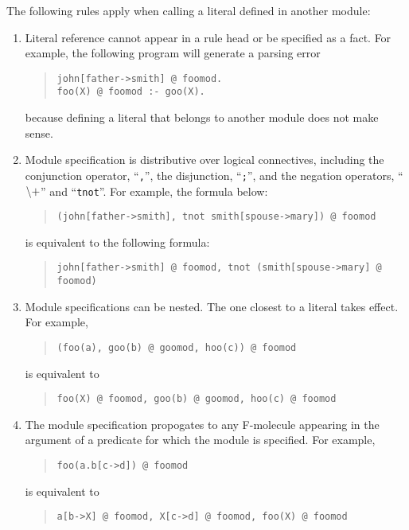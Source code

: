 \documentclass[11pt]{article}
\newcommand{\NAF}{{$\tt\backslash +$}\xspace}
\begin{document}
The following rules apply when calling a literal defined in another module:
\begin{enumerate}
\item Literal reference cannot appear in a rule head or be specified as
  a fact. For example, the following program will generate
  a parsing error
  \begin{quote}
    \verb|john[father->smith] @ foomod.| \\
    \verb|foo(X) @ foomod :- goo(X).|
  \end{quote}
  because defining a literal that belongs to another module does not make
  sense.
  
\item Module specification is distributive over logical connectives,
  including the conjunction operator, ``\verb|,|'', the disjunction,
  ``\verb|;|'', and the negation operators, ``\NAF'' and
  ``\verb|tnot|''. For example, the formula below:
  \begin{quote}
    \verb|(john[father->smith], tnot smith[spouse->mary]) @ foomod|
  \end{quote}
  is equivalent to the following formula:
  \begin{quote}
    \verb|john[father->smith] @ foomod, tnot (smith[spouse->mary] @ foomod)|
  \end{quote}

\item Module specifications can be nested. The one closest to a literal
  takes effect. For example,
  \begin{quote}
    \verb|(foo(a), goo(b) @ goomod, hoo(c)) @ foomod|
  \end{quote}
  is equivalent to
  \begin{quote}
    \verb|foo(X) @ foomod, goo(b) @ goomod, hoo(c) @ foomod|
  \end{quote}
  
\item The module specification propogates to any F-molecule appearing
  in the argument of a predicate for which the module is
  specified. For example,
  \begin{quote}
    \verb|foo(a.b[c->d]) @ foomod|
  \end{quote}
  is equivalent to
  \begin{quote}
    \verb|a[b->X] @ foomod, X[c->d] @ foomod, foo(X) @ foomod|
  \end{quote}
  

\end{enumerate}
\end{document}
